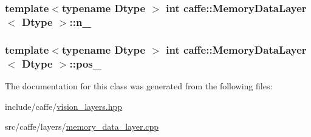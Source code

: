 \hypertarget{classcaffe_1_1_memory_data_layer_a303b19a435878a94ede0c8e1fb26f2a1}{
\subsubsection[{n\+\_\+}]{\setlength{\rightskip}{0pt plus 5cm}template$<$typename Dtype $>$ int {\bf caffe\+::\+Memory\+Data\+Layer}$<$ Dtype $>$\+::n\+\_\+\hspace{0.3cm}{\ttfamily [protected]}}}\label{classcaffe_1_1_memory_data_layer_a303b19a435878a94ede0c8e1fb26f2a1}
\hypertarget{classcaffe_1_1_memory_data_layer_a21694a78bc84c9cedae58e66ee542a5b}{
\subsubsection[{pos\+\_\+}]{\setlength{\rightskip}{0pt plus 5cm}template$<$typename Dtype $>$ int {\bf caffe\+::\+Memory\+Data\+Layer}$<$ Dtype $>$\+::pos\+\_\+\hspace{0.3cm}{\ttfamily [protected]}}}\label{classcaffe_1_1_memory_data_layer_a21694a78bc84c9cedae58e66ee542a5b}


The documentation for this class was generated from the following files\+:\begin{DoxyCompactItemize}
\item 
include/caffe/\hyperlink{vision__layers_8hpp}{vision\+\_\+layers.\+hpp}\item 
src/caffe/layers/\hyperlink{memory__data__layer_8cpp}{memory\+\_\+data\+\_\+layer.\+cpp}\end{DoxyCompactItemize}
